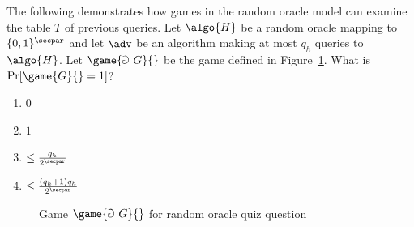 \begin{exercise}
  The following demonstrates how games in the random oracle model can examine the table $T$ of previous queries.
  Let $\algo{H}$ be a random oracle mapping to $\{0,1\}^\secpar$ and let $\adv$ be an algorithm making at most $q_h$ queries to $\algo{H}$.
  Let $\game{\Game~G}{}$ be the game defined in Figure~\ref{fig:quiz-ro-game}.
  What is $\Pr[\game{G}{} = 1]$?
  \begin{enumerate}
    \item $0$
    \item $1$
    \item $\leq \frac{q_h}{2^\secpar}$
    \item $\leq \frac{(q_h + 1) q_h}{2^\secpar}$
  \end{enumerate}
\end{exercise}

\begin{figure}[tbhp]
  \begin{center}
    \begin{tcolorbox}[width=0.6\textwidth]
      \begin{pchstack}[center]
      \end{pchstack}
    \end{tcolorbox}
  \end{center}
  \caption{Game $\game{\Game~G}{}$ for random oracle quiz question}
  \label{fig:quiz-ro-game}
\end{figure}

